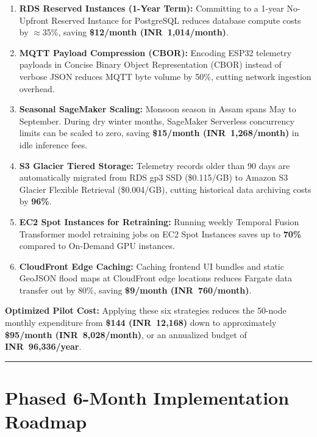 \documentclass[11pt,a4paper]{article}
\newcommand{\colorrule}{\vspace{4pt}\noindent\textcolor{FloodBlue!30}{\rule{\linewidth}{0.5pt}}\vspace{6pt}}
\begin{document}
\begin{enumerate}[leftmargin=1.8em,label=\textbf{\arabic*.},itemsep=2pt,topsep=2pt]
  \item \textbf{RDS Reserved Instances (1-Year Term):} Committing to a 1-year No-Upfront Reserved Instance for PostgreSQL reduces database compute costs by $\approx$35\%, saving \textbf{\$12/month (INR~1,014/month)}.
  \item \textbf{MQTT Payload Compression (CBOR):} Encoding ESP32 telemetry payloads in Concise Binary Object Representation (CBOR) instead of verbose JSON reduces MQTT byte volume by 50\%, cutting network ingestion overhead.
  \item \textbf{Seasonal SageMaker Scaling:} Monsoon season in Assam spans May to September. During dry winter months, SageMaker Serverless concurrency limits can be scaled to zero, saving \textbf{\$15/month (INR~1,268/month)} in idle inference fees.
  \item \textbf{S3 Glacier Tiered Storage:} Telemetry records older than 90 days are automatically migrated from RDS gp3 SSD (\$0.115/GB) to Amazon S3 Glacier Flexible Retrieval (\$0.004/GB), cutting historical data archiving costs by \textbf{96\%}.
  \item \textbf{EC2 Spot Instances for Retraining:} Running weekly Temporal Fusion Transformer model retraining jobs on EC2 Spot Instances saves up to \textbf{70\%} compared to On-Demand GPU instances.
  \item \textbf{CloudFront Edge Caching:} Caching frontend UI bundles and static GeoJSON flood maps at CloudFront edge locations reduces Fargate data transfer out by 80\%, saving \textbf{\$9/month (INR~760/month)}.
\end{enumerate}

\noindent
\textbf{Optimized Pilot Cost:} Applying these six strategies reduces the 50-node monthly expenditure from \textbf{\$144 (INR~12,168)} down to approximately \textbf{\$95/month (INR~8,028/month)}, or an annualized budget of \textbf{INR~96,336/year}.

\colorrule

\section{Phased 6-Month Implementation Roadmap}
\end{document}

